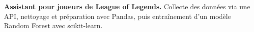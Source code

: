 
\begin{cvparagraph}
\noindent\textbf{Assistant pour joueurs de League of Legends.} Collecte des données via une API, nettoyage et préparation avec Pandas, puis entraînement d’un modèle Random Forest avec scikit-learn.
\end{cvparagraph}
